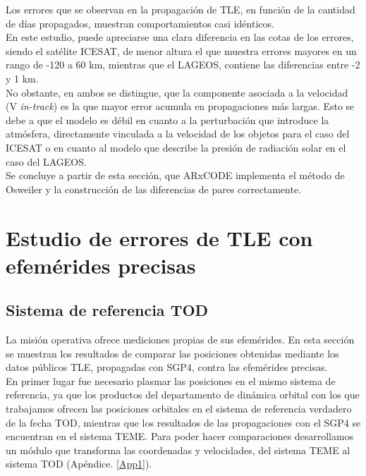 Los errores que se observan en la propagaci\'on de TLE, en funci\'on de la cantidad de d\'ias propagados, muestran comportamientos casi id\'enticos.\\

En este estudio, puede apreciarse una clara diferencia en las cotas de los errores, siendo el sat\'elite ICESAT, de menor altura el que muestra errores mayores en un rango de -120 a 60 km, mientras que el LAGEOS, contiene las diferencias entre -2 y 1 km.\\

No obstante, en ambos se distingue, que la componente asociada a la velocidad (V {\it{in-track}}) es la que mayor error acumula en propagaciones m\'as largas. Esto se debe a que el modelo es d\'ebil en cuanto a la perturbaci\'on que introduce la atm\'osfera, directamente vinculada a la velocidad de los objetos para el caso del ICESAT o en cuanto al modelo que describe la presi\'on de radiaci\'on solar en el caso del LAGEOS.\\

Se concluye a partir de esta secci\'on, que ARxCODE implementa el m\'etodo de Osweiler y la construcci\'on de las diferencias de pares correctamente. 

\section{Estudio de errores de TLE con efem\'erides precisas}
\subsection*{Sistema de referencia TOD}
La misi\'on operativa ofrece mediciones propias de sus efem\'erides. En esta secci\'on se muestran los resultados de comparar las posiciones obtenidas mediante los datos p\'ublicos TLE, propagadas con SGP4, contra las efem\'erides precisas.\\ 

En primer lugar fue necesario plasmar las posiciones en el mismo sistema de referencia, ya que los productos del departamento de din\'amica orbital con los que trabajamos ofrecen las posiciones orbitales en el sistema de referencia verdadero de la fecha \ac{TOD}, mientras que los resultados de las propagaciones con el SGP4 se encuentran en el sistema \ac{TEME}. Para poder hacer comparaciones desarrollamos un m\'odulo que transforma las coordenadas y velocidades, del sistema TEME al sistema TOD (Ap\'endice. \ref{App1}).\\

